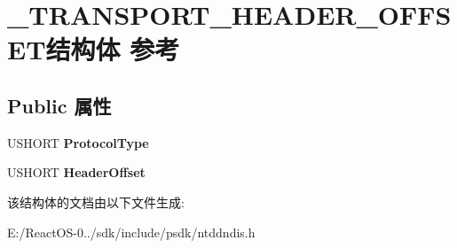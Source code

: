 \hypertarget{struct___t_r_a_n_s_p_o_r_t___h_e_a_d_e_r___o_f_f_s_e_t}{}\section{\+\_\+\+T\+R\+A\+N\+S\+P\+O\+R\+T\+\_\+\+H\+E\+A\+D\+E\+R\+\_\+\+O\+F\+F\+S\+E\+T结构体 参考}
\label{struct___t_r_a_n_s_p_o_r_t___h_e_a_d_e_r___o_f_f_s_e_t}
\subsection*{Public 属性}
\begin{DoxyCompactItemize}
\item 
\mbox{\label{struct___t_r_a_n_s_p_o_r_t___h_e_a_d_e_r___o_f_f_s_e_t_af550f4c870758f58adb2aad059fef78f}} 
U\+S\+H\+O\+RT {\bfseries Protocol\+Type}
\item 
\mbox{\label{struct___t_r_a_n_s_p_o_r_t___h_e_a_d_e_r___o_f_f_s_e_t_a135040be4fb6db1a7d76085dea45fedf}} 
U\+S\+H\+O\+RT {\bfseries Header\+Offset}
\end{DoxyCompactItemize}


该结构体的文档由以下文件生成\+:\begin{DoxyCompactItemize}
\item 
E\+:/\+React\+O\+S-\/0../sdk/include/psdk/ntddndis.\+h\end{DoxyCompactItemize}

